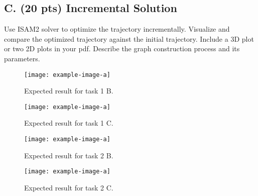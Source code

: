 \documentclass[tp]{lcc}
\begin{document}
\subsection{C. (20 pts) Incremental Solution}
Use ISAM2 solver to optimize the trajectory incrementally. Visualize and compare the optimized trajectory against the initial trajectory. Include a 3D plot or two 2D plots in your pdf. Describe the graph construction process and its parameters.

\begin{figure}[h]
    \centering
    \texttt{[image: example-image-a]}
    \caption{Expected result for task 1 B.}
    \label{fig:task1b}
\end{figure}

\begin{figure}[h]
    \centering
    \texttt{[image: example-image-a]}
    \caption{Expected result for task 1 C.}
    \label{fig:task1c}
\end{figure}

\begin{figure}[h]
    \centering
    \texttt{[image: example-image-a]}
    \caption{Expected result for task 2 B.}
    \label{fig:task2b}
\end{figure}

\begin{figure}[h]
    \centering
    \texttt{[image: example-image-a]}
    \caption{Expected result for task 2 C.}
    \label{fig:task2c}
\end{figure}
\end{document}
